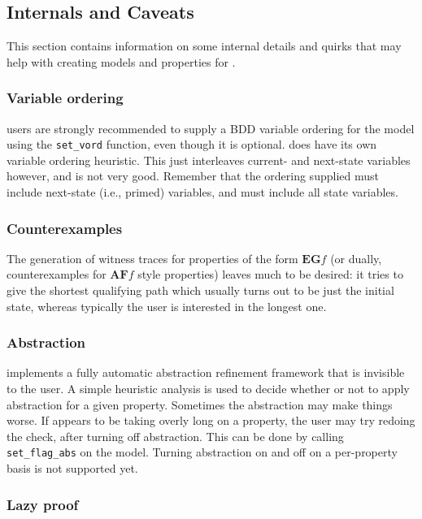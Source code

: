 \subsection{\hc{} Internals and Caveats}

This section contains information on some internal details and quirks that may help with creating models and properties for \hc{}.

\subsubsection{Variable ordering}

\hc{} users are strongly recommended to supply a BDD variable ordering for the model using the \texttt{set\_vord} function, even though it is optional. \hc{} does have its own variable ordering heuristic. This just interleaves current- and next-state variables however, and is not very good. Remember that the ordering supplied must include next-state (i.e., primed) variables, and must include all state variables.

\subsubsection{Counterexamples}

The generation of witness traces for properties of the form \(\mathbf{EG} f \) (or dually, counterexamples for \(\mathbf{AF} f \) style properties) leaves much to be desired: it tries to give the shortest qualifying path which usually turns out to be just the initial state, whereas typically the user is interested in the longest one.

\subsubsection{Abstraction}

\hc{} implements a fully automatic abstraction refinement framework that is invisible to the user. A simple heuristic analysis is used to decide whether or not to apply abstraction for a given property. Sometimes the abstraction may make things worse. If \hc{} appears to be taking overly long on a property, the user may try redoing the check, after turning off abstraction. This can be done by calling \texttt{set\_flag\_abs} on the model. Turning abstraction on and off on a per-property basis is not supported yet.

\subsubsection{Lazy proof}

